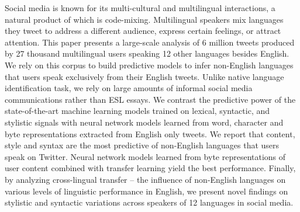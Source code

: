 Social media is known for its multi-cultural and multilingual interactions, a natural product of which is code-mixing. Multilingual speakers mix languages they tweet to address a different audience, express certain feelings, or attract attention. This paper presents a large-scale analysis of 6 million tweets produced by 27 thousand multilingual users speaking 12 other languages besides English. We rely on this corpus to build predictive models to infer non-English languages that users speak exclusively from their English tweets. Unlike native language identification task, we rely on large amounts of informal social media communications rather than ESL essays.  We contrast the predictive power of the state-of-the-art machine learning models trained on lexical, syntactic, and stylistic signals with neural network models learned from word, character and byte representations extracted from English only tweets. We report that content, style and syntax are the most predictive of non-English languages that users speak on Twitter. Neural network models learned from byte representations of user content combined with transfer learning yield the best performance. Finally, by analyzing cross-lingual transfer -- the influence of non-English languages on various levels of linguistic performance in English, we present novel findings on stylistic and syntactic variations across speakers of 12 languages in social media.
